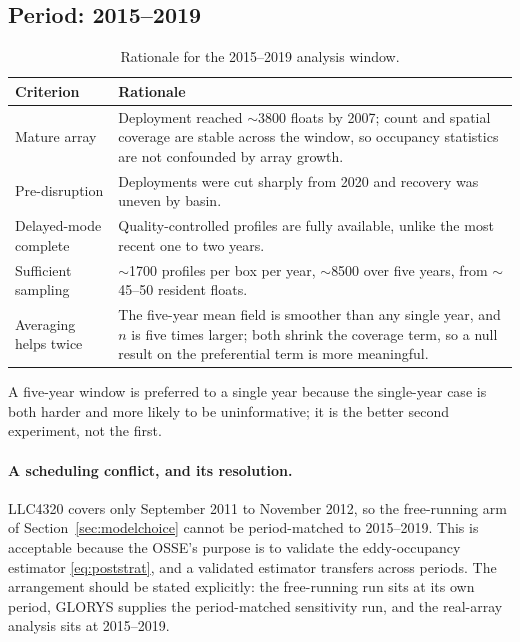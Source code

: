 \documentclass[11pt]{article}
\begin{document}
\subsection{Period: 2015--2019}
\label{sec:period}

\begin{table}[h]
\centering
\begin{tabular}{p{}p{}}
\toprule
Criterion & Rationale \\
\midrule
Mature array & Deployment reached $\sim$3800 floats by 2007; count and spatial coverage are
stable across the window, so occupancy statistics are not confounded by array growth. \\
Pre-disruption & Deployments were cut sharply from 2020 and recovery was uneven by basin. \\
Delayed-mode complete & Quality-controlled profiles are fully available, unlike the most
recent one to two years. \\
Sufficient sampling & $\sim$1700 profiles per box per year, $\sim$8500 over five years, from
$\sim$45--50 resident floats. \\
Averaging helps twice & The five-year mean field is smoother than any single year, and $n$ is
five times larger; both shrink the coverage term, so a null result on the preferential term is
more meaningful. \\
\bottomrule
\end{tabular}
\caption{Rationale for the 2015--2019 analysis window.}
\end{table}

A five-year window is preferred to a single year because the single-year case is both harder
and more likely to be uninformative; it is the better second experiment, not the first.

\paragraph{A scheduling conflict, and its resolution.} LLC4320 covers only September 2011 to
November 2012, so the free-running arm of Section~\ref{sec:modelchoice} cannot be
period-matched to 2015--2019. This is acceptable because the OSSE's purpose is to validate the
eddy-occupancy estimator \eqref{eq:poststrat}, and a validated estimator transfers across
periods. The arrangement should be stated explicitly: the free-running run sits at its own
period, GLORYS supplies the period-matched sensitivity run, and the real-array analysis sits at
2015--2019.
\end{document}
